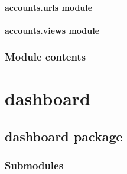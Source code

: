 \documentclass[a4paper,11pt,spanish]{sphinxmanual}
\begin{document}
\subsubsection{accounts.urls module}
\label{\detokenize{api/accounts/accounts.urls:module-accounts.urls}}\label{\detokenize{api/accounts/accounts.urls:accounts-urls-module}}\label{\detokenize{api/accounts/accounts.urls::doc}}
\sphinxstepscope


\subsubsection{accounts.views module}
\label{\detokenize{api/accounts/accounts.views:module-accounts.views}}\label{\detokenize{api/accounts/accounts.views:accounts-views-module}}\label{\detokenize{api/accounts/accounts.views::doc}}

\subsection{Module contents}
\label{\detokenize{api/accounts/accounts:module-accounts}}\label{\detokenize{api/accounts/accounts:module-contents}}
\sphinxstepscope


\chapter{dashboard}
\label{\detokenize{api/dashboard/modules:dashboard}}\label{\detokenize{api/dashboard/modules::doc}}
\sphinxstepscope


\section{dashboard package}
\label{\detokenize{api/dashboard/dashboard:dashboard-package}}\label{\detokenize{api/dashboard/dashboard::doc}}

\subsection{Submodules}
\label{\detokenize{api/dashboard/dashboard:submodules}}
\sphinxstepscope
\end{document}
